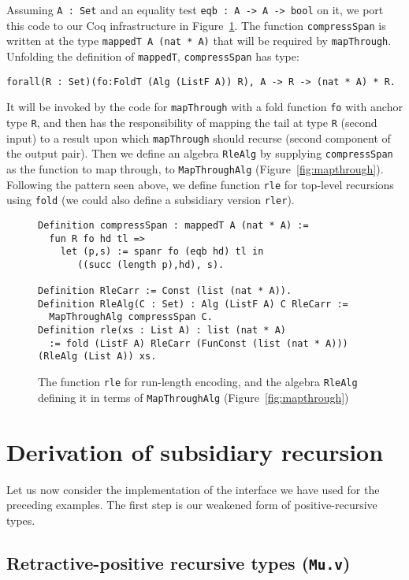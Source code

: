 \documentclass[a4paper,USenglish]{lipics-v2021}
\begin{document}
Assuming \verb|A : Set| and an equality test \verb|eqb : A -> A -> bool| on it,
we port this code to our Coq infrastructure in Figure~\ref{fig:rle}.
The function \verb|compressSpan| is written at the type \verb|mappedT A (nat * A)| that
will be required by \verb|mapThrough|.  Unfolding the definition of \verb|mappedT|,
\verb|compressSpan| has type:
\begin{verbatim}
forall(R : Set)(fo:FoldT (Alg (ListF A)) R), A -> R -> (nat * A) * R.
\end{verbatim}
\noindent It will be invoked by the code for \verb|mapThrough| with a
fold function \verb|fo| with anchor type \verb|R|, and then has the
responsibility of mapping the tail at type \verb|R| (second input) to
a result upon which \verb|mapThrough| should recurse (second component
of the output pair).  Then we define an algebra \verb|RleAlg| by
supplying \verb|compressSpan| as the function to map through, to
\verb|MapThroughAlg| (Figure~\ref{fig:mapthrough}).  Following the
pattern seen above, we define function \verb|rle| for top-level
recursions using \verb|fold| (we could also define a subsidiary version
\verb|rler|).



\begin{figure}
\begin{verbatim}
Definition compressSpan : mappedT A (nat * A) :=
  fun R fo hd tl => 
    let (p,s) := spanr fo (eqb hd) tl in
       ((succ (length p),hd), s).

Definition RleCarr := Const (list (nat * A)).
Definition RleAlg(C : Set) : Alg (ListF A) C RleCarr :=
  MapThroughAlg compressSpan C.
Definition rle(xs : List A) : list (nat * A)
  := fold (ListF A) RleCarr (FunConst (list (nat * A))) (RleAlg (List A)) xs.
\end{verbatim}
\caption{The function \texttt{rle} for run-length encoding, and the algebra \texttt{RleAlg} defining it
in terms of \texttt{MapThroughAlg} (Figure~\ref{fig:mapthrough})}
\label{fig:rle}
\end{figure}

\section{Derivation of subsidiary recursion}
\label{sec:deriv}

Let us now consider the implementation of the
interface we have used for the preceding examples.
The first step is our weakened form of positive-recursive
types.

\subsection{Retractive-positive recursive types (\texttt{Mu.v})}
\label{sec:mu}
\end{document}
